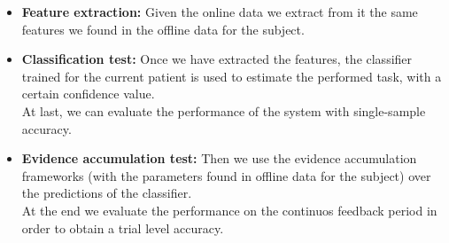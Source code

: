 \begin{itemize}
\item \textbf{Feature extraction:} Given the online data we extract from it the same features we found in the offline data for the subject. 
\item \textbf{Classification test:} Once we have extracted the features, the classifier trained for the current patient is used to estimate the performed task, with a certain confidence value. \\
At last, we can evaluate the performance of the system with single-sample accuracy.
\item \textbf{Evidence accumulation test:} Then we use the evidence accumulation frameworks (with the parameters found in offline data for the subject) over the predictions of the classifier.\\
At the end we evaluate the performance on the continuos feedback period in order to obtain a trial level accuracy.
\end{itemize}